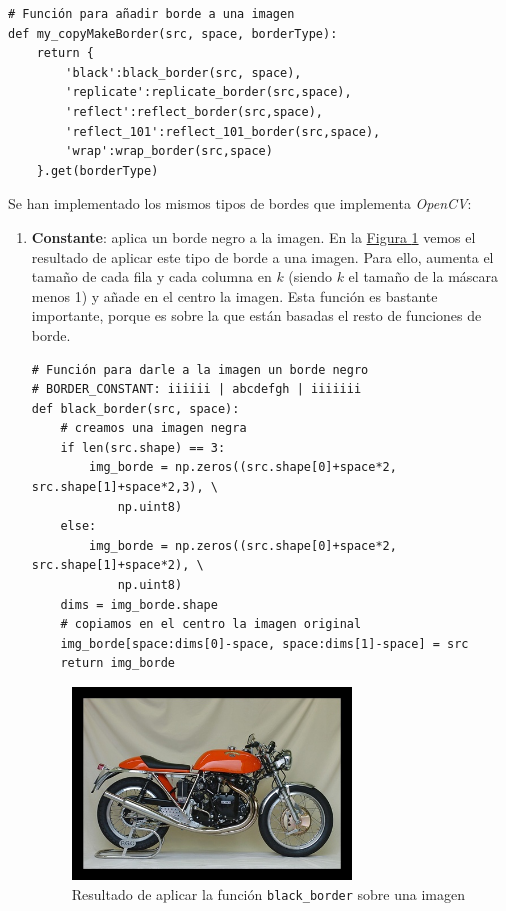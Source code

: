 \documentclass[11pt,a4paper]{article}
\theoremstyle{plain}
\theoremstyle{definition}
\begin{document}
\begin{verbatim}
# Función para añadir borde a una imagen
def my_copyMakeBorder(src, space, borderType):
    return {
        'black':black_border(src, space),
        'replicate':replicate_border(src,space),
        'reflect':reflect_border(src,space),
        'reflect_101':reflect_101_border(src,space),
        'wrap':wrap_border(src,space)
    }.get(borderType)
\end{verbatim}

Se han implementado los mismos tipos de bordes que implementa \textit{OpenCV}:

\begin{enumerate}[$\qquad\bullet$]
\item \textbf{Constante}: aplica un borde negro a la imagen. En la \hyperref[black]{Figura \ref*{black}} vemos el resultado de aplicar este tipo de borde a una imagen. Para ello, aumenta el tamaño de cada fila y cada columna en $k$ (siendo $k$ el tamaño de la máscara menos 1) y añade en el centro la imagen. Esta función es bastante importante, porque es sobre la que están basadas el resto de funciones de borde.

\begin{verbatim}
# Función para darle a la imagen un borde negro 
# BORDER_CONSTANT: iiiiii | abcdefgh | iiiiiii
def black_border(src, space):
    # creamos una imagen negra
    if len(src.shape) == 3:
        img_borde = np.zeros((src.shape[0]+space*2, src.shape[1]+space*2,3), \
            np.uint8)
    else:
        img_borde = np.zeros((src.shape[0]+space*2, src.shape[1]+space*2), \
            np.uint8)
    dims = img_borde.shape
    # copiamos en el centro la imagen original
    img_borde[space:dims[0]-space, space:dims[1]-space] = src
    return img_borde
\end{verbatim}

\begin{figure}[!h]
    \centering
    \includegraphics[width=0.7\textwidth]{borde_negro}
    \caption{Resultado de aplicar la función \texttt{black\_border} sobre una imagen}
    \label{black}
\end{figure}


\end{enumerate}
\end{document}
